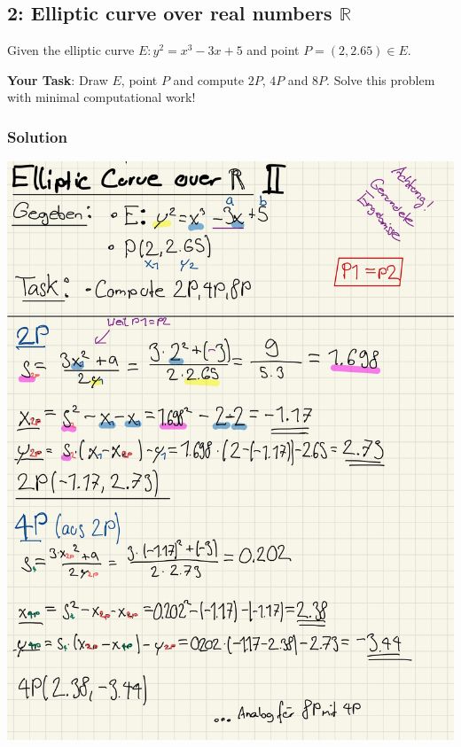 \documentclass[11pt]{article}
\begin{document}
    \hypertarget{elliptic-curve-over-real-numbers-mathbbr}{%
\subsection{\texorpdfstring{2: Elliptic curve over real numbers
\(\mathbb{R}\)}{2 Elliptic curve over real numbers \textbackslash{}mathbb\{R\}}}\label{elliptic-curve-over-real-numbers-mathbbr}}

Given the elliptic curve \(E : y^2 = x^3 - 3x + 5\) and point
\(P = (2,2.65) \in E\).

\textbf{Your Task}: Draw \(E\), point \(P\) and compute \(2P\), \(4P\)
and \(8P\). Solve this problem with minimal computational work!

\hypertarget{solution}{%
\subsubsection{Solution}\label{solution}}

\begin{center}
	\includegraphics[scale=0.87]{img/ecurve2.jpg}
\end{center}
\end{document}
